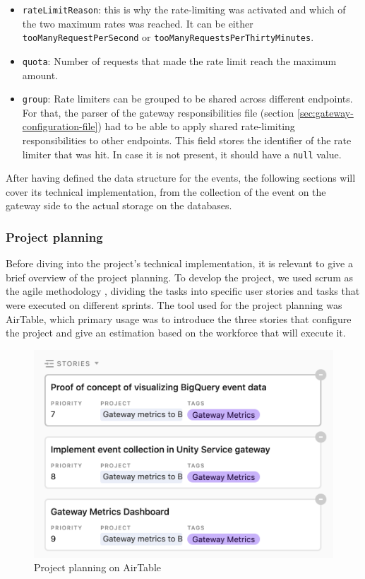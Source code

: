 \documentclass[english, 12pt, a4paper, sci, utf8, a-1b, online]{aaltothesis}
\begin{document}
\begin{itemize}
    \item \texttt{rateLimitReason}: this is why the rate-limiting was activated and which of the two maximum rates was reached. It can be either \texttt{tooManyRequestPerSecond} or \texttt{tooManyRequestsPerThirtyMinutes}.
    \item \texttt{quota}: Number of requests that made the rate limit reach the maximum amount.
    \item \texttt{group}: Rate limiters can be grouped to be shared across different endpoints. For that, the parser of the gateway responsibilities file (section \ref{sec:gateway-configuration-file}) had to be able to apply shared rate-limiting responsibilities to other endpoints. This field stores the identifier of the rate limiter that was hit. In case it is not present, it should have a \texttt{null} value.
\end{itemize}

After having defined the data structure for the events, the following sections will cover its technical implementation, from the collection of the event on the gateway side to the actual storage on the databases.

\subsubsection{Project planning}

Before diving into the project's technical implementation, it is relevant to give a brief overview of the project planning. To develop the project, we used scrum as the agile methodology \cite{schwaber1997scrum}, dividing the tasks into specific user stories and tasks that were executed on different sprints. The tool used for the project planning was AirTable, which primary usage was to introduce the three stories that configure the project and give an estimation based on the workforce that will execute it.\\

\begin{figure}[h!]
    \centering
    \includegraphics[scale=0.3]{src/thesis/img/technical-solution/project-planning.png}
    \caption{Project planning on AirTable}
\end{figure}
\end{document}
